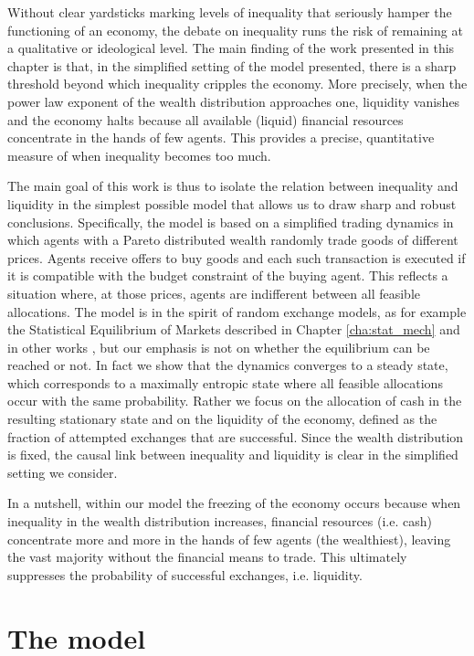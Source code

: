 Without clear yardsticks marking levels of inequality that seriously hamper the functioning of an economy, the debate on inequality runs the risk of remaining at a qualitative or ideological level. The main finding of the work presented in this chapter is that, in the simplified setting of the model presented, there is a sharp threshold beyond which inequality cripples the economy. More precisely, when the power law exponent of the wealth distribution approaches one, liquidity vanishes and the economy halts because all available (liquid) financial resources concentrate in the hands of few agents. This provides a precise, quantitative measure of when inequality becomes too much. 

The main goal of this work is thus to isolate the relation between inequality and liquidity in the simplest possible model that allows us to draw sharp and robust conclusions. Specifically, the model is based on a simplified trading dynamics in which agents with a Pareto distributed wealth randomly trade goods of different prices.  Agents receive offers to buy goods and each such transaction is executed if it is compatible with the budget constraint of the buying agent. This reflects a situation where, at those prices, agents are indifferent between all feasible allocations. The model is in the spirit of random exchange models, as for example the Statistical Equilibrium of Markets described in Chapter \ref{cha:stat_mech} and in other works \cite{SjurFlam2012, Yakovenko2009Review}, but our emphasis is not on whether the equilibrium can be reached or not. In fact we show that the dynamics converges to a steady state, which corresponds to a maximally entropic state where all feasible allocations occur with the same probability. Rather we focus on the allocation of cash in the resulting stationary state and on the liquidity of the economy, defined as the fraction of attempted exchanges that are successful. Since the wealth distribution is fixed, the causal link between inequality and liquidity is clear in the simplified setting we consider.

In a nutshell, within our model the freezing of the economy occurs because when inequality in the wealth distribution increases, financial resources (i.e. cash) concentrate more and more in the hands of few agents (the wealthiest), leaving the vast majority without the financial means to trade. This ultimately suppresses the probability of successful exchanges, i.e. liquidity. 


\section{The model}
\label{sec:modelDescription}

